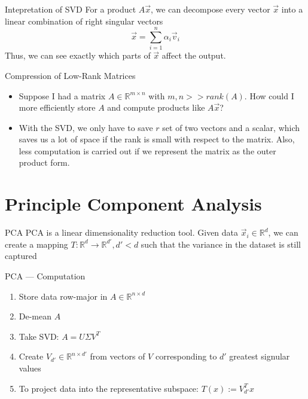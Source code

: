 \documentclass{beamer}
\begin{document}
    \begin{frame}{Intepretation of SVD}
		For a product $A \vec{x}$, we can decompose every vector $\vec{x}$ into a linear combination of right singular vectors
		\[ \vec x = \sum_{i = 1}^n \alpha_i \vec{v}_i \]
		Thus, we can see exactly which parts of $\vec{x}$ affect the output.
    \end{frame}


	\begin{frame}{Compression of Low-Rank Matrices}
	\begin{itemize}[<+->]
	\item Suppose I had a matrix $A \in \mathbb{R}^{m \times n}$ with $m, n >> rank(A)$. How could I more efficiently store $A$ and compute products like $A \vec{x}$?
	\vspace{2em}
	\item With the SVD, we only have to save $r$ set of two vectors and a scalar, which saves us a lot of space if the rank is small with respect to the matrix. Also, less computation is carried out if we represent the matrix as the outer product form.
	\end{itemize}
	\end{frame}

	\section[PCA]{Principle Component Analysis}

	\begin{frame}{PCA}
	PCA is a linear dimensionality reduction tool. Given data $\vec{x}_i \in \mathbb{R}^d$, we can create a mapping $T : \mathbb{R}^d \rightarrow \mathbb{R}^{d'}, d' < d$ such that the variance in the dataset is still captured
	\end{frame}

	\begin{frame}{PCA --- Computation}
		\begin{enumerate}[<+->]
			\item Store data row-major in $A \in \mathbb{R}^{n \times d}$
			\item De-mean $A$
			\item Take SVD: $A = U \Sigma V^T$
			\item Create $V_{d'} \in \mathbb{R}^{n \times d'}$ from vectors of $V$ corresponding to $d'$ greatest signular values
			\item To project data into the representative subspace: $T(x) := V_{d'}^T x$
		\end{enumerate}
	\end{frame}
\end{document}
